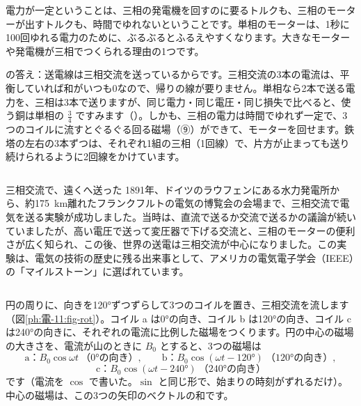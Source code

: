 \noindent 電力が一定ということは、三相の発電機を回すのに要るトルクも、三相のモーターが出すトルクも、時間でゆれないということです。単相のモーターは、1秒に100回ゆれる電力のために、ぶるぶるとふるえやすくなります。大きなモーターや発電機が三相でつくられる理由の1つです。

\bkhatenaref の答え：送電線は三相交流を送っているからです。三相交流の3本の電流は、平衡していれば和がいつも0なので、帰りの線が要りません。単相なら2本で送る電力を、三相は3本で送りますが、同じ電力・同じ電圧・同じ損失で比べると、使う銅は単相の $\tfrac34$ ですみます（）。しかも、三相の電力は時間でゆれず一定で、3つのコイルに流すとぐるぐる回る磁場（⑨）ができて、モーターを回せます。鉄塔の左右の3本ずつは、それぞれ1組の三相（1回線）で、片方が止まっても送り続けられるように2回線をかけています。

\begin{phflow}[三相の電力]
\end{phflow}

\begin{column}{三相交流で、遠くへ送った}
1891年、ドイツのラウフェンにある水力発電所から、約\qty{175}{km}離れたフランクフルトの電気の博覧会の会場まで、三相交流で電気を送る実験が成功しました。当時は、直流で送るか交流で送るかの議論が続いていましたが、高い電圧で送って変圧器で下げる交流と、三相のモーターの便利さが広く知られ、この後、世界の送電は三相交流が中心になりました。この実験は、電気の技術の歴史に残る出来事として、アメリカの電気電子学会（IEEE）の「マイルストーン」に選ばれています。
\end{column}

\label{ph:電-11:sec9}
円の周りに、向きを120°ずつずらして3つのコイルを置き、三相交流を流します（図\ref{ph:電-11:fig-rot}）。コイル a は0°の向き、コイル b は120°の向き、コイル c は240°の向きに、それぞれの電流に比例した磁場をつくります。円の中心の磁場の大きさを、電流が山のときに $B_0$ とすると、3つの磁場は
\[\text{a：}B_0\cos\omega t\ \text{（0°の向き）},\qquad \text{b：}B_0\cos(\omega t-120°)\ \text{（120°の向き）},\]
\[\text{c：}B_0\cos(\omega t-240°)\ \text{（240°の向き）}\]
です（電流を $\cos$ で書いた。$\sin$ と同じ形で、始まりの時刻がずれるだけ）。中心の磁場は、この3つの矢印のベクトルの和です。

